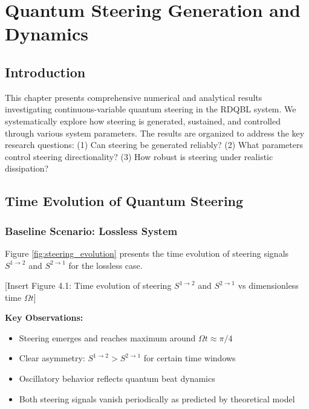 
\chapter{Quantum Steering Generation and Dynamics}
\label{chp4}
\newpage

\section{Introduction}

This chapter presents comprehensive numerical and analytical results investigating continuous-variable quantum steering in the RDQBL system. We systematically explore how steering is generated, sustained, and controlled through various system parameters. The results are organized to address the key research questions: (1) Can steering be generated reliably? (2) What parameters control steering directionality? (3) How robust is steering under realistic dissipation?

\section{Time Evolution of Quantum Steering}

\subsection{Baseline Scenario: Lossless System}

Figure \ref{fig:steering_evolution} presents the time evolution of steering signals $S^{1 \to 2}$ and $S^{2 \to 1}$ for the lossless case.

[Insert Figure 4.1: Time evolution of steering $S^{1 \to 2}$ and $S^{2 \to 1}$ vs dimensionless time $\Omega t$]

\textbf{Key Observations:}
\begin{itemize}
	\item Steering emerges and reaches maximum around $\Omega t \approx \pi/4$
	\item Clear asymmetry: $S^{1 \to 2} > S^{2 \to 1}$ for certain time windows
	\item Oscillatory behavior reflects quantum beat dynamics
	\item Both steering signals vanish periodically as predicted by theoretical model
\end{itemize}

